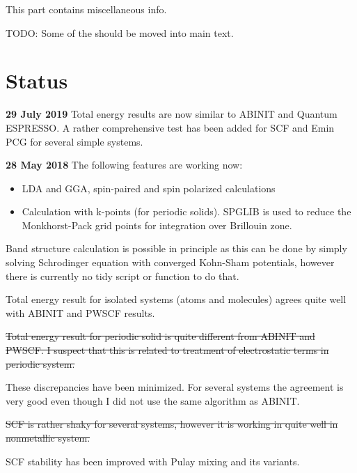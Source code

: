 \documentclass[a4paper,fleqn]{article}
\begin{document}
This part contains miscellaneous info.

TODO: Some of the should be moved into main text.




\section*{Status}

\textbf{29 July 2019} Total energy results are now similar to ABINIT
and Quantum ESPRESSO. A rather comprehensive test has been added
for SCF and Emin PCG for several simple systems.


\textbf{28 May 2018} The following features are working now:
\begin{itemize}
\item LDA and GGA, spin-paired and spin polarized calculations
\item Calculation with k-points (for periodic solids).
  \textsf{SPGLIB} is used to reduce the Monkhorst-Pack grid points
  for integration over Brillouin zone.
\end{itemize}

Band structure calculation is possible in principle as this can be
done by simply solving
Schrodinger equation with converged Kohn-Sham potentials, however there
is currently no tidy script or function to do that.

Total energy result for isolated systems (atoms and molecules) agrees quite
well with ABINIT and PWSCF results.

\sout{Total energy result for periodic solid is quite different from ABINIT and PWSCF.
I suspect that this is related to treatment of electrostatic terms in periodic system.}

These discrepancies have been minimized. For several systems the agreement is very good
even though I did not use the same algorithm as ABINIT.

\sout{SCF is rather shaky for several systems, however it is working in quite well in nonmetallic
system.}

SCF stability has been improved with Pulay mixing and its variants.





\end{document}

